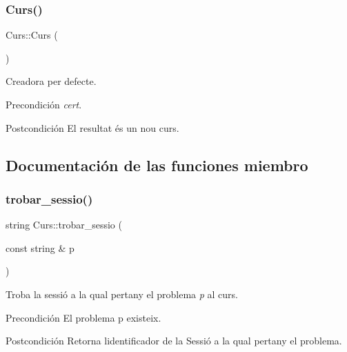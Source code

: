 \subsubsection{\texorpdfstring{Curs()}{Curs()}}
{\footnotesize\ttfamily Curs\+::\+Curs (\begin{DoxyParamCaption}{ }\end{DoxyParamCaption})}



Creadora per defecte. 

\begin{DoxyPrecond}{Precondición}
{\itshape cert}. 
\end{DoxyPrecond}
\begin{DoxyPostcond}{Postcondición}
El resultat és un nou curs. 
\end{DoxyPostcond}


\subsection{Documentación de las funciones miembro}
\mbox{\label{class_curs_ab9c0e100a9c7231c5c96911c94602fff}} 
\subsubsection{\texorpdfstring{trobar\+\_\+sessio()}{trobar\_sessio()}}
{\footnotesize\ttfamily string Curs\+::trobar\+\_\+sessio (\begin{DoxyParamCaption}\item[{const string \&}]{p }\end{DoxyParamCaption})}



Troba la sessió a la qual pertany el problema {\itshape p} al curs. 

\begin{DoxyPrecond}{Precondición}
El problema p existeix. 
\end{DoxyPrecond}
\begin{DoxyPostcond}{Postcondición}
Retorna l\textquotesingle{}identificador de la Sessió a la qual pertany el problema. 
\end{DoxyPostcond}
\mbox{\label{class_curs_a54b500f472e5ae51395bca6fe1e0bd09}} 

